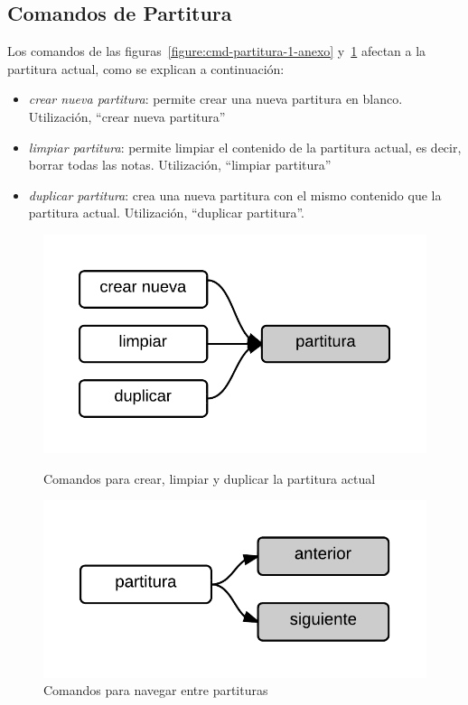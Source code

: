 \subsection{Comandos de Partitura}

Los comandos de las figuras~\ref{figure:cmd-partitura-1-anexo} y~\ref{figure:cmd-partitura-2-anexo} afectan a
la partitura actual, como se explican a continuaci\'on:

\begin{itemize}
    \item \emph{crear nueva  partitura}:  permite crear una nueva partitura en blanco. Utilizaci\'on, ``crear nueva partitura''
    \item \emph{limpiar  partitura}: permite limpiar el contenido de la partitura actual, es decir, borrar todas las notas. Utilizaci\'on, ``limpiar partitura''
    \item \emph{duplicar partitura}: crea una nueva partitura con el mismo contenido que la partitura actual. Utilizaci\'on, ``duplicar partitura''.
\end{itemize}

\begin{figure}[H]
\begin{minipage}[b]{0.5\linewidth}
\centering
\includegraphics[width=0.6\linewidth]{./graphics/partitura-1.png}
\caption{Comandos para crear, limpiar y duplicar la partitura actual}
\label{figure:cmd-partitura-1-anexo}
\end{minipage}
\quad
\begin{minipage}[b]{0.5\linewidth}
\centering
\includegraphics[width=0.6\linewidth]{./graphics/partitura-2.png}
\caption{Comandos para navegar entre partituras}
\label{figure:cmd-partitura-2-anexo}
\end{minipage}
\end{figure} 

